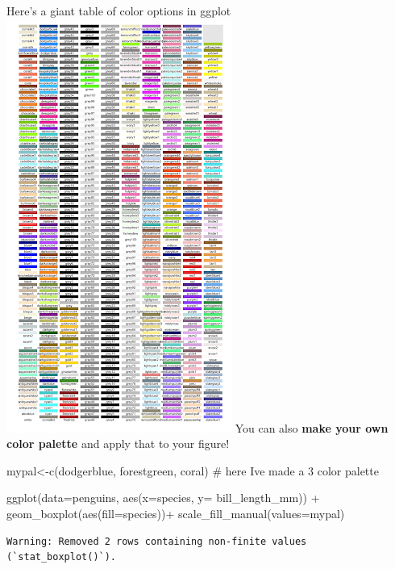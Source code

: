 \documentclass[
  letterpaper,
  DIV=11,
  numbers=noendperiod]{scrartcl}
\newenvironment{Shaded}{\begin{snugshade}}{\end{snugshade}}
\newcommand{\AttributeTok}[1]{\textcolor[rgb]{0.40,0.45,0.13}{#1}}
\newcommand{\CommentTok}[1]{\textcolor[rgb]{0.37,0.37,0.37}{#1}}
\newcommand{\FunctionTok}[1]{\textcolor[rgb]{0.28,0.35,0.67}{#1}}
\newcommand{\NormalTok}[1]{\textcolor[rgb]{0.00,0.23,0.31}{#1}}
\newcommand{\OtherTok}[1]{\textcolor[rgb]{0.00,0.23,0.31}{#1}}
\newcommand{\SpecialCharTok}[1]{\textcolor[rgb]{0.37,0.37,0.37}{#1}}
\newcommand{\StringTok}[1]{\textcolor[rgb]{0.13,0.47,0.30}{#1}}
\begin{document}
Here's a giant table of color options in ggplot
\includegraphics{images/ggplot_colors.png} You can also \textbf{make
your own color palette} and apply that to your figure!

\begin{Shaded}
\begin{Highlighting}[]
\NormalTok{mypal}\OtherTok{\textless{}{-}}\FunctionTok{c}\NormalTok{(}\StringTok{\textquotesingle{}dodgerblue\textquotesingle{}}\NormalTok{, }\StringTok{\textquotesingle{}forestgreen\textquotesingle{}}\NormalTok{, }\StringTok{\textquotesingle{}coral\textquotesingle{}}\NormalTok{) }\CommentTok{\# here I\textquotesingle{}ve made a 3 color palette}

\FunctionTok{ggplot}\NormalTok{(}\AttributeTok{data=}\NormalTok{penguins, }\FunctionTok{aes}\NormalTok{(}\AttributeTok{x=}\NormalTok{species, }\AttributeTok{y=}\NormalTok{ bill\_length\_mm)) }\SpecialCharTok{+}
  \FunctionTok{geom\_boxplot}\NormalTok{(}\FunctionTok{aes}\NormalTok{(}\AttributeTok{fill=}\NormalTok{species))}\SpecialCharTok{+}
  \FunctionTok{scale\_fill\_manual}\NormalTok{(}\AttributeTok{values=}\NormalTok{mypal)}
\end{Highlighting}
\end{Shaded}

\begin{verbatim}
Warning: Removed 2 rows containing non-finite values (`stat_boxplot()`).
\end{verbatim}
\end{document}
